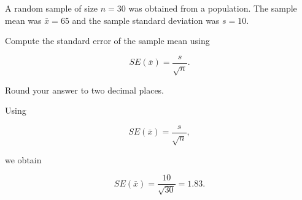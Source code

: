 
\begin{question}
A random sample of size \(n=30\) was obtained from a population. The sample mean was \(\bar{x}=65\) and the sample standard deviation was \(s=10\).

Compute the standard error of the sample mean using

\[
SE(\bar{x})=\frac{s}{\sqrt{n}}.
\]

Round your answer to two decimal places.
\end{question}

\begin{solution}
Using

\[
SE(\bar{x})=\frac{s}{\sqrt{n}},
\]

we obtain

\[
SE(\bar{x})=
\frac{10}{\sqrt{30}}
=
1.83.
\]
\end{solution}

